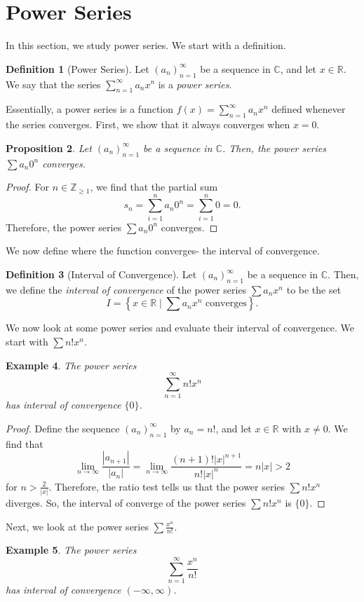 \documentclass[a4paper, openany]{memoir}
\theoremstyle{definition}
\newtheorem{definition}{Definition}[section]
\theoremstyle{plain}
\newtheorem{proposition}[definition]{Proposition}
\newtheorem{example}[definition]{Example}
\begin{document}
\section{Power Series}
In this section, we study power series. We start with a definition.
\begin{definition}[Power Series]
Let $(a_n)_{n=1}^{\infty}$ be a sequence in $\mathbb{C}$, and let $x \in \mathbb{R}$. We say that the series $\sum_{n=1}^{\infty} a_n x^n$ is a \emph{power series}.
\end{definition}
\noindent Essentially, a power series is a function $f(x) = \sum_{n=1}^{\infty} a_n x^n$ defined whenever the series converges. First, we show that it always converges when $x = 0$.
\begin{proposition}
Let $(a_n)_{n=1}^{\infty}$ be a sequence in $\mathbb{C}$. Then, the power series $\sum a_n 0^n$ converges.
\end{proposition}
\begin{proof}
For $n \in \mathbb{Z}_{\geqslant 1}$, we find that the partial sum
\[s_n = \sum_{i=1}^n a_n 0^n = \sum_{i=1}^n 0 = 0.\]
Therefore, the power series $\sum a_n 0^n$ converges.
\end{proof}
\noindent We now define where the function converges- the interval of convergence.
\begin{definition}[Interval of Convergence]
Let $(a_n)_{n=1}^{\infty}$ be a sequence in $\mathbb{C}$. Then, we define the \emph{interval of convergence} of the power series $\sum a_n x^n$ to be the set
\[I = \left\{x \in \mathbb{R} \mid \sum a_n x^n \text{ converges}\right\}.\]
\end{definition}
We now look at some power series and evaluate their interval of convergence. We start with $\sum n! x^n$.
\begin{example}
The power series
\[\sum_{n=1}^{\infty} n! x^n\]
has interval of convergence $\{0\}$.
\end{example}
\begin{proof}
Define the sequence $(a_n)_{n=1}^{\infty}$ by $a_n = n!$, and let $x \in \mathbb{R}$ with $x \neq 0$. We find that
\[\lim_{n \to \infty} \frac{|a_{n+1}|}{|a_n|} = \lim_{n \to \infty} \frac{(n+1)! |x|^{n+1}}{n! |x|^n} = n|x| > 2\]
for $n > \frac{2}{|x|}$. Therefore, the ratio test tells us that the power series $\sum n! x^n$ diverges. So, the interval of converge of the power series $\sum n! x^n$ is $\{0\}$.
\end{proof}
\noindent Next, we look at the power series $\sum \frac{x^n}{n!}$.
\begin{example}
The power series
\[\sum_{n=1}^{\infty} \frac{x^n}{n!}\]
has interval of convergence $(-\infty, \infty)$.
\end{example}
\end{document}
